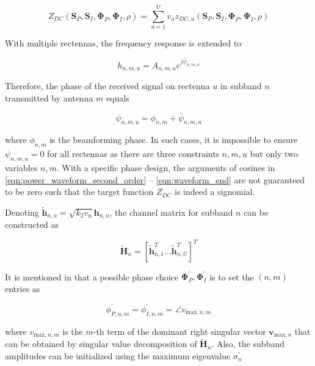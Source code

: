 \begin{equation}\label{eqn:weighted_target}
  {Z_{DC}}\left( {{{\mathbf{S}}_P},{{\mathbf{S}}_I},{{\mathbf{\Phi }}_P},{{\mathbf{\Phi }}_I},\rho } \right) = \sum\limits_{u = 1}^U {{v_u}{z_{DC,u}}\left( {{{\mathbf{S}}_P},{{\mathbf{S}}_I},{{\mathbf{\Phi }}_P},{{\mathbf{\Phi }}_I},\rho } \right)}
\end{equation}

With multiple rectennas, the frequency response is extended to

\begin{equation}\label{eqn:mo_channel}
  {h_{n,m,u}} = {A_{n,m,u}}{e^{j{{\bar \psi }_{n,m,u}}}}
\end{equation}

Therefore, the phase of the received signal on rectenna $u$ in subband $n$ transmitted by antenna $m$ equals

\begin{equation}\label{eqn:received_phase}
  {\psi _{n,m,u}} = {\phi _{n,m}} + {{\bar \psi }_{n,m,u}}
\end{equation}

where ${\phi _{n,m}}$ is the beamforming phase. In such cases, it is impossible to ensure ${\psi _{n,m,u}} = 0$ for all rectennas as there are three constraints $n,m,u$ but only two variables $n,m$. With a specific phase design, the arguments of cosines in \eqref{eqn:power_waveform_second_order} -- \eqref{eqn:waveform_end} are not guaranteed to be zero such that the target function ${Z_{DC}}$ is indeed a signomial.

Denoting ${\widetilde {\mathbf{h}}_{n,u}} = \sqrt {{k_2}{v_u}} {{\mathbf{h}}_{n,u}}$, the channel matrix for subband $n$ can be constructed as

\begin{equation}\label{eqn:mo_channel_matrox}
  {\widetilde {\mathbf{H}}_n} = {\left[ {\widetilde {\mathbf{h}}_{n,1}^T \ldots \widetilde {\mathbf{h}}_{n,U}^T} \right]^T}
\end{equation}

It is mentioned in \cite{Clerckx2016} that a possible phase choice ${\mathbf{\Phi }}_P^\prime ,{\mathbf{\Phi }}_I^\prime $ is to set the $\left( {n,m} \right)$ entries as

\begin{equation}\label{eqn:mo_phases}
  \phi _{P,n,m}^\prime  = \phi _{I,n,m}^\prime  = \angle {v_{{\text{max}},n,m}}
\end{equation}

where ${v_{{\text{max}},n,m}}$ is the $m$-th term of the dominant right singular vector ${{\mathbf{v}}_{{\text{max}},n}}$ that can be obtained by singular value decomposition of ${\widetilde {\mathbf{H}}_n}$. Also, the subband amplitudes can be initialized using the maximum eigenvalue $\sigma _n^\prime $

